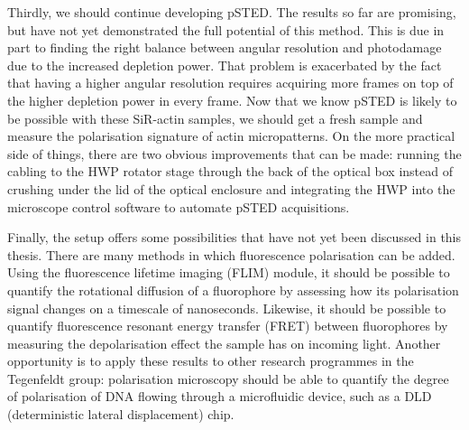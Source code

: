 Thirdly, we should continue developing pSTED. The results so far are promising, but have not yet demonstrated the full potential of this method. This is due in part to finding the right balance between angular resolution and photodamage due to the increased depletion power. That problem is exacerbated by the fact that having a higher angular resolution requires acquiring more frames on top of the higher depletion power in every frame. Now that we know pSTED is likely to be possible with these SiR-actin samples, we should get a fresh sample and measure the polarisation signature of actin micropatterns. On the more practical side of things, there are two obvious improvements that can be made: running the cabling to the HWP rotator stage through the back of the optical box instead of crushing under the lid of the optical enclosure and integrating the HWP into the microscope control software to automate pSTED acquisitions.

Finally, the setup offers some possibilities that have not yet been discussed in this thesis. There are many methods in which fluorescence polarisation can be added. Using the fluorescence lifetime imaging (FLIM) module, it should be possible to quantify the rotational diffusion of a fluorophore by assessing how its polarisation signal changes on a timescale of nanoseconds. Likewise, it should be possible to quantify fluorescence resonant energy transfer (FRET) between fluorophores by measuring the depolarisation effect the sample has on incoming light. Another opportunity is to apply these results to other research programmes in the Tegenfeldt group: polarisation microscopy should be able to quantify the degree of polarisation of DNA flowing through a microfluidic device, such as a DLD (deterministic lateral displacement) chip.